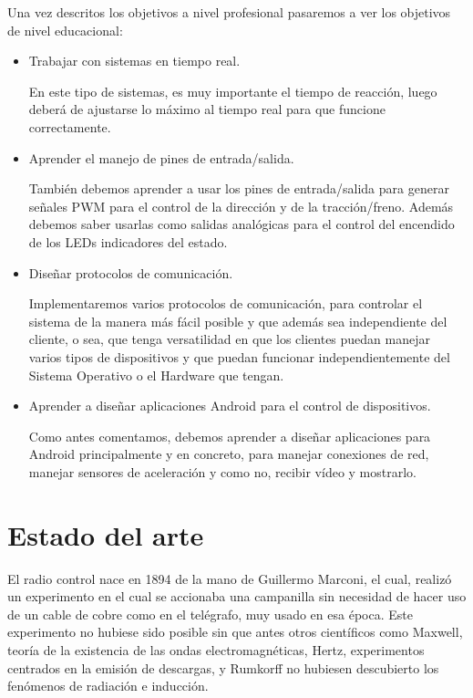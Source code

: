 \documentclass{pclass}
\begin{document}
Una vez descritos los objetivos a nivel profesional pasaremos a ver los objetivos de nivel educacional:
\begin{itemize}
	\item Trabajar con sistemas en tiempo real. 
	
	En este tipo de sistemas, es muy importante el tiempo de reacción, luego deberá de ajustarse lo máximo al tiempo real para que funcione correctamente.
	
	\item Aprender el manejo de pines de entrada/salida. 
	
	También debemos aprender a usar los pines de entrada/salida para generar señales PWM para el control de la dirección y de la tracción/freno. Además debemos saber usarlas como salidas analógicas para el control del encendido de los LEDs indicadores del estado.
	
	\item Diseñar protocolos de comunicación. 
	
	Implementaremos varios protocolos de comunicación, para controlar el sistema de la manera más fácil posible y que además sea independiente del cliente, o sea, que tenga versatilidad en que los clientes puedan manejar varios tipos de dispositivos y que puedan funcionar independientemente del Sistema Operativo o el Hardware que tengan.
	
	\item Aprender a diseñar aplicaciones Android para el control de dispositivos. 
	
	Como antes comentamos, debemos aprender a diseñar aplicaciones para Android principalmente y en concreto, para manejar conexiones de red, manejar sensores de aceleración y como no, recibir vídeo y mostrarlo.
	
\end{itemize}
\section{Estado del arte}
El radio control nace en 1894 de la mano de Guillermo Marconi, el cual, realizó un experimento en el cual se accionaba una campanilla sin necesidad de hacer uso de un cable de cobre como en el telégrafo, muy usado en esa época. Este experimento no hubiese sido posible sin que antes otros científicos como Maxwell, teoría de la existencia de las ondas electromagnéticas, Hertz, experimentos centrados en la emisión de descargas, y Rumkorff no hubiesen descubierto los fenómenos de radiación e inducción.
\end{document}
